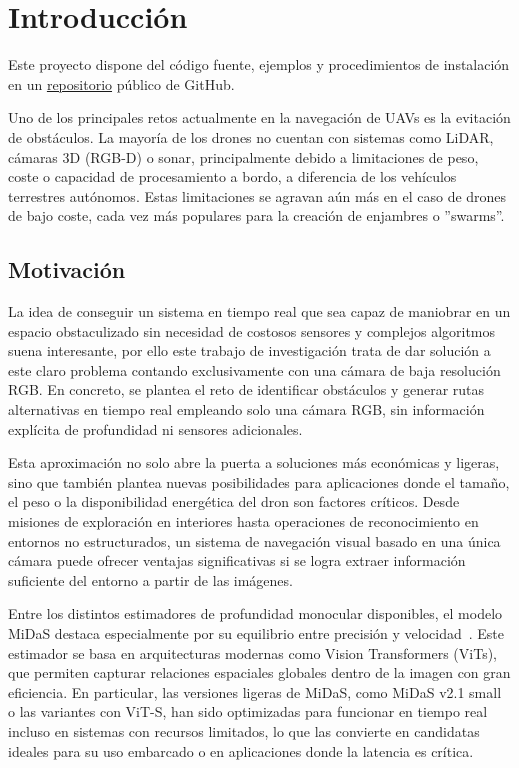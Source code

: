   \chapter{Introducción}
Este proyecto dispone del código fuente, ejemplos y procedimientos de instalación en un \href{https://github.com/andrelorenzo/Vision2D_navigation}{repositorio} público de GitHub.

Uno de los principales retos actualmente en la navegación de UAVs es la evitación de obstáculos. La mayoría de los drones no cuentan con sistemas como LiDAR, cámaras 3D (RGB-D) o sonar, principalmente debido a limitaciones de peso, coste o capacidad de procesamiento a bordo, a diferencia de los vehículos terrestres autónomos. Estas limitaciones se agravan aún más en el caso de drones de bajo coste, cada vez más populares para la creación de enjambres o ''swarms''.

    \section{Motivación}
La idea de conseguir un sistema en tiempo real que sea capaz de maniobrar en un espacio obstaculizado sin necesidad de costosos sensores y complejos algoritmos suena interesante, por ello este trabajo de investigación trata de dar solución a este claro problema contando exclusivamente con una cámara de baja resolución RGB. En concreto, se plantea el reto de identificar obstáculos y generar rutas alternativas en tiempo real empleando solo una cámara RGB, sin información explícita de profundidad ni sensores adicionales.

Esta aproximación no solo abre la puerta a soluciones más económicas y ligeras, sino que también plantea nuevas posibilidades para aplicaciones donde el tamaño, el peso o la disponibilidad energética del dron son factores críticos. Desde misiones de exploración en interiores hasta operaciones de reconocimiento en entornos no estructurados, un sistema de navegación visual basado en una única cámara puede ofrecer ventajas significativas si se logra extraer información suficiente del entorno a partir de las imágenes.

Entre los distintos estimadores de profundidad monocular disponibles, el modelo MiDaS destaca especialmente por su equilibrio entre precisión y velocidad~\cite{Ranftl2020}. Este estimador se basa en arquitecturas modernas como Vision Transformers (ViTs), que permiten capturar relaciones espaciales globales dentro de la imagen con gran eficiencia. En particular, las versiones ligeras de MiDaS, como MiDaS v2.1 small o las variantes con ViT-S, han sido optimizadas para funcionar en tiempo real incluso en sistemas con recursos limitados, lo que las convierte en candidatas ideales para su uso embarcado o en aplicaciones donde la latencia es crítica.

